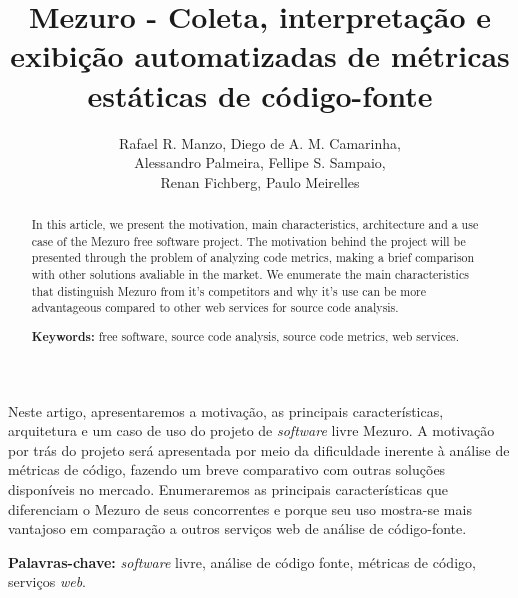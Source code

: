 \documentclass[12pt]{article}
\begin{document}
\sloppy
\title{Mezuro - Coleta, interpretação e exibição automatizadas de métricas estáticas de código-fonte}

\author{Rafael R. Manzo, Diego de A. M. Camarinha,\\
        Alessandro Palmeira, Fellipe S. Sampaio,\\
        Renan Fichberg, Paulo Meirelles}

\address{Instituto de Matemática e Estatística -- Universidade de São Paulo (USP)\\
  Rua do Matão, 1010 -- 05508-090 -- Cidade Universitária -- São Paulo -- SP -- Brasil
\nextinstitute
  Faculdade de Engenharia -- UnB Gama (FGA)\\
  Gama -- DF -- Brasil
}

\maketitle
\begin{abstract}
  In this article, we present the motivation, main characteristics, architecture and a use case of the Mezuro free software project. The motivation behind the project will be presented through the problem of analyzing code metrics, making a brief comparison with other solutions avaliable in the market. We enumerate the main characteristics that distinguish Mezuro from it's competitors and why it's use can be more advantageous compared to other web services for source code analysis.

  \textbf{Keywords:} free software, source code analysis, source code metrics, web services.
\end{abstract}

\begin{resumo}
  Neste artigo, apresentaremos a motivação, as principais características, arquitetura e um caso de uso do projeto de \textit{software} livre Mezuro. A motivação por trás do projeto será apresentada por meio da dificuldade inerente à análise de métricas de código, fazendo um breve comparativo com outras soluções disponíveis no mercado. Enumeraremos as principais características que diferenciam o Mezuro de seus concorrentes e porque seu uso mostra-se mais vantajoso em comparação a outros serviços web de análise de código-fonte.

  \textbf{Palavras-chave:} \textit{software} livre, análise de código fonte, métricas de código, serviços \textit{web}.
\end{resumo}
\end{document}
